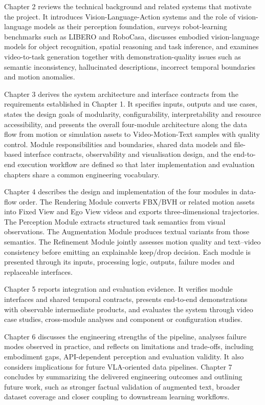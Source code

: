 \documentclass[11pt,oneside]{report}
\begin{document}
Chapter 2 reviews the technical background and related systems that motivate the project. It introduces Vision-Language-Action systems and the role of vision-language models as their perception foundation, surveys robot-learning benchmarks such as LIBERO and RoboCasa, discusses embodied vision-language models for object recognition, spatial reasoning and task inference, and examines video-to-task generation together with demonstration-quality issues such as semantic inconsistency, hallucinated descriptions, incorrect temporal boundaries and motion anomalies. 

Chapter 3 derives the system architecture and interface contracts from the requirements established in Chapter 1. It specifies inputs, outputs and use cases, states the design goals of modularity, configurability, interpretability and resource accessibility, and presents the overall four-module architecture along the data flow from motion or simulation assets to Video-Motion-Text samples with quality control. Module responsibilities and boundaries, shared data models and file-based interface contracts, observability and visualisation design, and the end-to-end execution workflow are defined so that later implementation and evaluation chapters share a common engineering vocabulary.

Chapter 4 describes the design and implementation of the four modules in data-flow order. The Rendering Module converts FBX/BVH or related motion assets into Fixed View and Ego View videos and exports three-dimensional trajectories. The Perception Module extracts structured task semantics from visual observations. The Augmentation Module produces textual variants from those semantics. The Refinement Module jointly assesses motion quality and text–video consistency before emitting an explainable keep/drop decision. Each module is presented through its inputs, processing logic, outputs, failure modes and replaceable interfaces.

Chapter 5 reports integration and evaluation evidence. It verifies module interfaces and shared temporal contracts, presents end-to-end demonstrations with observable intermediate products, and evaluates the system through video case studies, cross-module analyses and component or configuration studies. 

Chapter 6 discusses the engineering strengths of the pipeline, analyses failure modes observed in practice, and reflects on limitations and trade-offs, including embodiment gaps, API-dependent perception and evaluation validity. It also considers implications for future VLA-oriented data pipelines. Chapter 7 concludes by summarizing the delivered engineering outcomes and outlining future work, such as stronger factual validation of augmented text, broader dataset coverage and closer coupling to downstream learning workflows.
\end{document}
